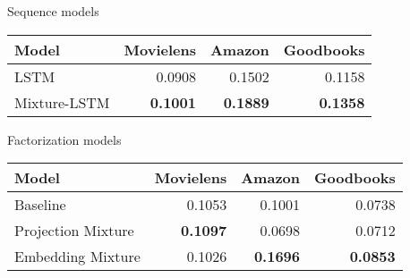 \begin{subtable}{\columnwidth}
\caption{Sequence models}
\begin{tabularx}{\columnwidth}{lrrr}
\toprule
 Model        &   Movielens &   Amazon &   Goodbooks \\
\midrule
 LSTM         &          0.0908 &   0.1502 &      0.1158 \\
 Mixture-LSTM &          \textbf{0.1001} &   \textbf{0.1889} &      \textbf{0.1358} \\
\bottomrule
\end{tabularx}
\end{subtable}
\hspace{\fill}
\begin{subtable}{\columnwidth}
\caption{Factorization models}
\begin{tabularx}{\columnwidth}{lrrr}
\toprule
 Model              &   Movielens &   Amazon &   Goodbooks \\
\midrule
 Baseline           &          0.1053 &   0.1001 &      0.0738 \\
 Projection Mixture &          \textbf{0.1097} &   0.0698 &      0.0712 \\
 Embedding Mixture  &          0.1026 &   \textbf{0.1696} &      \textbf{0.0853} \\
\bottomrule
\end{tabularx}
\end{subtable}
